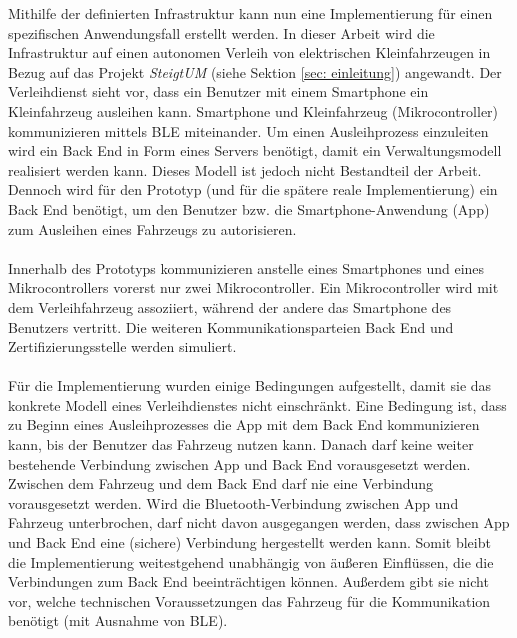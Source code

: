 Mithilfe der definierten Infrastruktur kann nun eine Implementierung für einen spezifischen Anwendungsfall erstellt werden. In dieser Arbeit wird die Infrastruktur auf einen autonomen Verleih von elektrischen Kleinfahrzeugen in Bezug auf das Projekt \textit{SteigtUM} (siehe Sektion \ref{sec: einleitung}) angewandt. Der Verleihdienst sieht vor, dass ein Benutzer mit einem Smartphone ein Kleinfahrzeug ausleihen kann. Smartphone und Kleinfahrzeug (Mikrocontroller) kommunizieren mittels BLE miteinander. Um einen Ausleihprozess einzuleiten wird ein Back End in Form eines Servers benötigt, damit ein Verwaltungsmodell realisiert werden kann. Dieses Modell ist jedoch nicht Bestandteil der Arbeit. Dennoch wird für den Prototyp (und für die spätere reale Implementierung) ein Back End benötigt, um den Benutzer bzw. die Smartphone-Anwendung (App) zum Ausleihen eines Fahrzeugs zu autorisieren.
\\\\
Innerhalb des Prototyps kommunizieren anstelle eines Smartphones und eines Mikrocontrollers vorerst nur zwei Mikrocontroller. Ein Mikrocontroller wird mit dem Verleihfahrzeug assoziiert, während der andere das Smartphone des Benutzers vertritt. Die weiteren Kommunikationsparteien Back End und Zertifizierungsstelle werden simuliert.
\\\\
Für die Implementierung wurden einige Bedingungen aufgestellt, damit sie das konkrete Modell eines Verleihdienstes nicht einschränkt. Eine Bedingung ist, dass zu Beginn eines Ausleihprozesses die App mit dem Back End kommunizieren kann, bis der Benutzer das Fahrzeug nutzen kann. Danach darf keine weiter bestehende Verbindung zwischen App und Back End vorausgesetzt werden. Zwischen dem Fahrzeug und dem Back End darf nie eine Verbindung vorausgesetzt werden. Wird die Bluetooth-Verbindung zwischen App und Fahrzeug unterbrochen, darf nicht davon ausgegangen werden, dass zwischen App und Back End eine (sichere) Verbindung hergestellt werden kann. Somit bleibt die Implementierung weitestgehend unabhängig von äußeren Einflüssen, die die Verbindungen zum Back End beeinträchtigen können. Außerdem gibt sie nicht vor, welche technischen Voraussetzungen das Fahrzeug für die Kommunikation benötigt (mit Ausnahme von BLE).